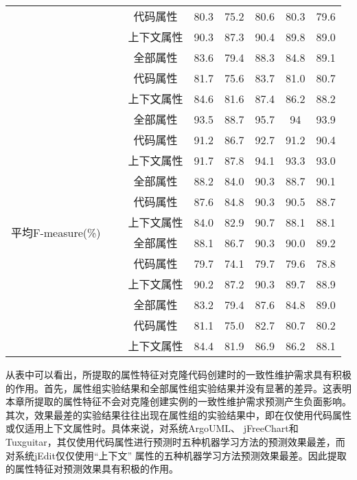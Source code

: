 \begin{table} [htbp]
\begin{tabular}{cccccccc}
&  &代码属性 & 80.3    & 75.2  & 80.6 & 80.3 & 79.6 \\
&   &  上下文属性 & 90.3    & 87.3  & 90.4 & 89.8 & 89.0  \\
\cline{2-8}
&~\multirow{3}{*}{Tuxguitar} 
&全部属性 & 83.6    & 79.4  & 88.3 & 84.8 & 89.1 \\
&   &代码属性 & 81.7    & 75.6  & 83.7 & 81.0  & 80.7 \\
&    & 上下文属性& 84.6    & 81.6  & 87.4 & 86.2 & 88.2 \\
\hline
\multirow{12}{*}{平均F-measure(\%)}
&~\multirow{3}{*}{ArgoUML}
& 全部属性 & 93.5    & 88.7  & 95.7 & 94  & 93.9 \\
 &  & 代码属性 & 91.2    & 86.7  & 92.7 & 91.2 & 90.4 \\
 &   &  上下文属性& 91.7    & 87.8  & 94.1 & 93.3 & 93.0  \\
\cline{2-8}
&~\multirow{3}{*}{jEdit} 
& 全部属性 & 88.2    & 84.0   & 90.3 & 88.7 & 90.1 \\
&   &代码属性& 87.6    & 84.8  & 90.3 & 90.5 & 88.7 \\
&   &  上下文属性& 84.0     & 82.9  & 90.7 & 88.1 & 88.1 \\
\cline{2-8}
&~\multirow{3}{*}{jFreeChart} 
&  全部属性& 88.1    & 86.7  & 90.3 & 90.0   & 89.2 \\
&  &代码属性 & 79.7    & 74.1  & 79.7 & 79.6 & 78.8 \\
&   & 上下文属性 & 90.2    & 87.2  & 90.3 & 89.7 & 88.9 \\
\cline{2-8}
&~\multirow{3}{*}{Tuxguitar} 
&全部属性 & 83.2    & 79.4  & 87.6 & 84.8 & 89.0  \\
&  &代码属性& 81.1    & 75.0   & 82.7 & 80.7 & 80.2 \\
&  & 上下文属性& 84.4    & 81.9  & 86.9 & 86.2 & 88.1\\
\bottomrule[1.5pt]
\end{tabular}
\end{table} 

从表中可以看出，所提取的属性特征对克隆代码创建时的一致性维护需求具有积极的作用。首先，属性组实验结果和全部属性组实验结果并没有显著的差异。这表明本章所提取的属性特征不会对克隆创建实例的一致性维护需求预测产生负面影响。其次，效果最差的实验结果往往出现在属性组的实验结果中，即在仅使用代码属性或仅适用上下文属性时。具体来说，对系统ArgoUML、 jFreeChart和 Tuxguitar，其仅使用代码属性进行预测时五种机器学习方法的预测效果最差，而对系统jEdit仅仅使用“上下文” 属性的五种机器学习方法预测效果最差。因此提取的属性特征对预测效果具有积极的作用。

